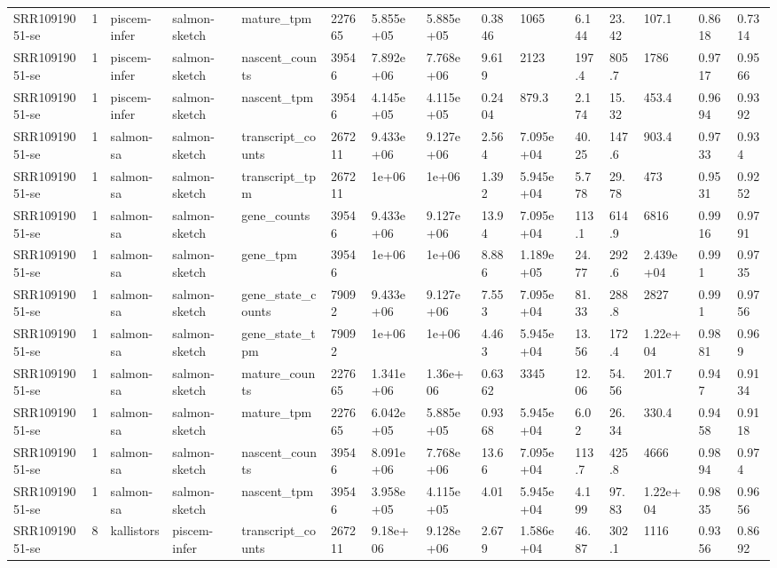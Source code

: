\begin{tabular}{lllllllllllllll}
SRR10919051-se & 1 & piscem-infer & salmon-sketch & mature\_tpm & 227665 & 5.855e+05 & 5.885e+05 & 0.3846 & 1065 & 6.144 & 23.42 & 107.1 & 0.8618 & 0.7314 \\
SRR10919051-se & 1 & piscem-infer & salmon-sketch & nascent\_counts & 39546 & 7.892e+06 & 7.768e+06 & 9.619 & 2123 & 197.4 & 805.7 & 1786 & 0.9717 & 0.9566 \\
SRR10919051-se & 1 & piscem-infer & salmon-sketch & nascent\_tpm & 39546 & 4.145e+05 & 4.115e+05 & 0.2404 & 879.3 & 2.174 & 15.32 & 453.4 & 0.9694 & 0.9392 \\
SRR10919051-se & 1 & salmon-sa & salmon-sketch & transcript\_counts & 267211 & 9.433e+06 & 9.127e+06 & 2.564 & 7.095e+04 & 40.25 & 147.6 & 903.4 & 0.9733 & 0.934 \\
SRR10919051-se & 1 & salmon-sa & salmon-sketch & transcript\_tpm & 267211 & 1e+06 & 1e+06 & 1.392 & 5.945e+04 & 5.778 & 29.78 & 473 & 0.9531 & 0.9252 \\
SRR10919051-se & 1 & salmon-sa & salmon-sketch & gene\_counts & 39546 & 9.433e+06 & 9.127e+06 & 13.94 & 7.095e+04 & 113.1 & 614.9 & 6816 & 0.9916 & 0.9791 \\
SRR10919051-se & 1 & salmon-sa & salmon-sketch & gene\_tpm & 39546 & 1e+06 & 1e+06 & 8.886 & 1.189e+05 & 24.77 & 292.6 & 2.439e+04 & 0.991 & 0.9735 \\
SRR10919051-se & 1 & salmon-sa & salmon-sketch & gene\_state\_counts & 79092 & 9.433e+06 & 9.127e+06 & 7.553 & 7.095e+04 & 81.33 & 288.8 & 2827 & 0.991 & 0.9756 \\
SRR10919051-se & 1 & salmon-sa & salmon-sketch & gene\_state\_tpm & 79092 & 1e+06 & 1e+06 & 4.463 & 5.945e+04 & 13.56 & 172.4 & 1.22e+04 & 0.9881 & 0.969 \\
SRR10919051-se & 1 & salmon-sa & salmon-sketch & mature\_counts & 227665 & 1.341e+06 & 1.36e+06 & 0.6362 & 3345 & 12.06 & 54.56 & 201.7 & 0.947 & 0.9134 \\
SRR10919051-se & 1 & salmon-sa & salmon-sketch & mature\_tpm & 227665 & 6.042e+05 & 5.885e+05 & 0.9368 & 5.945e+04 & 6.02 & 26.34 & 330.4 & 0.9458 & 0.9118 \\
SRR10919051-se & 1 & salmon-sa & salmon-sketch & nascent\_counts & 39546 & 8.091e+06 & 7.768e+06 & 13.66 & 7.095e+04 & 113.7 & 425.8 & 4666 & 0.9894 & 0.974 \\
SRR10919051-se & 1 & salmon-sa & salmon-sketch & nascent\_tpm & 39546 & 3.958e+05 & 4.115e+05 & 4.01 & 5.945e+04 & 4.199 & 97.83 & 1.22e+04 & 0.9835 & 0.9656 \\
SRR10919051-se & 8 & kallistors & piscem-infer & transcript\_counts & 267211 & 9.18e+06 & 9.128e+06 & 2.679 & 1.586e+04 & 46.87 & 302.1 & 1116 & 0.9356 & 0.8692 \\

\end{tabular}
